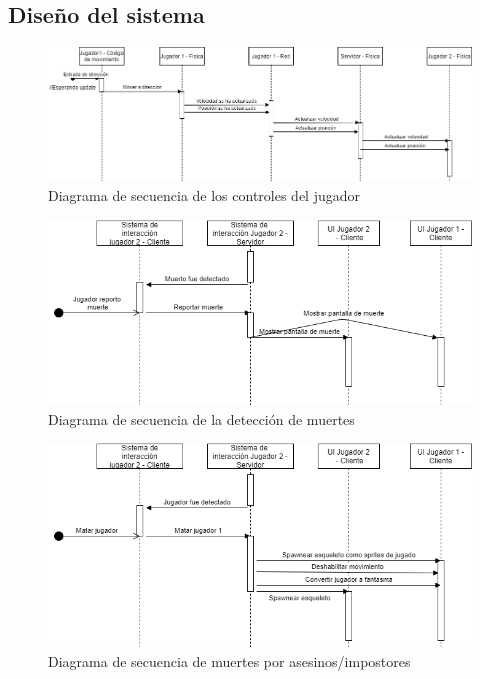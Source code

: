 \subsection{Diseño del sistema}
\begin{figure}[h]
    \centering
    \includegraphics[width=1\linewidth]{images/diagrama_secuencia_movimientos.png}
    \caption{Diagrama de secuencia de los controles del jugador}
    \label{fig:diagrama_sec_movimiento}
\end{figure}
\begin{figure}[h]
    \centering
    \includegraphics[width=1\linewidth]{images/diagrama_deteccion_muerte.png}
    \caption{Diagrama de secuencia de la detección de muertes}
    \label{fig:diagrama_sec_detect_muertes}
\end{figure}
\begin{figure}[h]
    \centering
    \includegraphics[width=1\linewidth]{images/diagrama_sec_matar.png}
    \caption{Diagrama de secuencia de muertes por asesinos/impostores}
    \label{fig:diagrama_sec_muertes_por_impost}
\end{figure}

